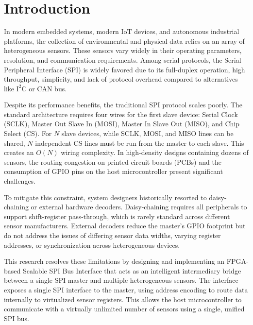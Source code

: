 \documentclass[conference]{IEEEtran}
\begin{document}
\section{Introduction}
In modern embedded systems, modern IoT devices, and autonomous industrial platforms, the collection of environmental and physical data relies on an array of heterogeneous sensors. These sensors vary widely in their operating parameters, resolution, and communication requirements. Among serial protocols, the Serial Peripheral Interface (SPI) is widely favored due to its full-duplex operation, high throughput, simplicity, and lack of protocol overhead compared to alternatives like $\text{I}^2\text{C}$ or CAN bus.

Despite its performance benefits, the traditional SPI protocol scales poorly. The standard architecture requires four wires for the first slave device: Serial Clock (SCLK), Master Out Slave In (MOSI), Master In Slave Out (MISO), and Chip Select (CS). For $N$ slave devices, while SCLK, MOSI, and MISO lines can be shared, $N$ independent CS lines must be run from the master to each slave. This creates an $O(N)$ wiring complexity. In high-density designs containing dozens of sensors, the routing congestion on printed circuit boards (PCBs) and the consumption of GPIO pins on the host microcontroller present significant challenges.

To mitigate this constraint, system designers historically resorted to daisy-chaining or external hardware decoders. Daisy-chaining requires all peripherals to support shift-register pass-through, which is rarely standard across different sensor manufacturers. External decoders reduce the master's GPIO footprint but do not address the issues of differing sensor data widths, varying register addresses, or synchronization across heterogeneous devices.

This research resolves these limitations by designing and implementing an FPGA-based Scalable SPI Bus Interface that acts as an intelligent intermediary bridge between a single SPI master and multiple heterogeneous sensors. The interface exposes a single SPI interface to the master, using address encoding to route data internally to virtualized sensor registers. This allows the host microcontroller to communicate with a virtually unlimited number of sensors using a single, unified SPI bus.
\end{document}
